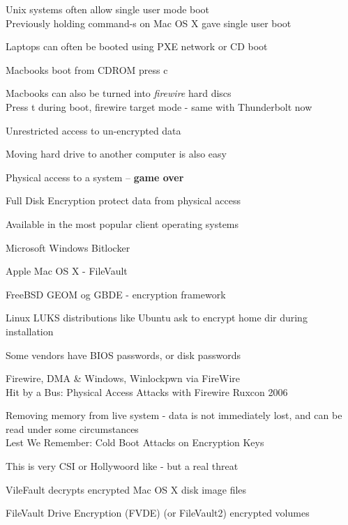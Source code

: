 \documentclass[Screen16to9,17pt]{foils}
\begin{document}
\begin{list1}
\item Unix systems often allow single user mode boot\\
Previously holding command-s on Mac OS X gave single user boot
\item Laptops can often be booted using PXE network or CD boot
\item Macbooks boot from CDROM press c
\item Macbooks can also be turned into \emph{firewire} hard discs\\
Press t during boot, firewire target mode - same with Thunderbolt now
\item Unrestricted access to un-encrypted data
\item Moving hard drive to another computer is also easy
\end{list1}
\pause
\centerline{Physical access to a system -- {\bf game over}}



\begin{list1}
\item Full Disk Encryption protect data from physical access
\item Available in the most popular client operating systems
\begin{list2}
\item Microsoft Windows Bitlocker
\item Apple Mac OS X - FileVault
\item FreeBSD GEOM og GBDE - encryption framework
\item Linux LUKS distributions like Ubuntu ask to encrypt home dir during installation
\item Some vendors have BIOS passwords, or disk passwords
\end{list2}
\end{list1}


\begin{list2}
\item Firewire, DMA \& Windows, Winlockpwn via FireWire\\
Hit by a Bus: Physical Access Attacks with Firewire Ruxcon 2006
\item Removing memory from live system - data is not immediately lost, and can be read under some circumstances\\
Lest We Remember: Cold Boot Attacks on Encryption Keys\\
\item This is very CSI or Hollywoord like - but a real threat
\item VileFault decrypts encrypted Mac OS X disk image files\\ 
\item  FileVault Drive Encryption (FVDE) (or FileVault2) encrypted volumes\\
\end{list2}
\end{document}
